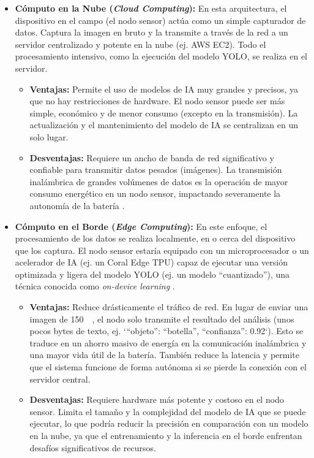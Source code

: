 \begin{itemize}
    \item \textbf{Cómputo en la Nube (\textit{Cloud Computing}):} En esta arquitectura, el dispositivo en el campo (el nodo sensor) actúa como un simple capturador de datos. Captura la imagen en bruto y la transmite a través de la red a un servidor centralizado y potente en la nube (ej. AWS EC2). Todo el procesamiento intensivo, como la ejecución del modelo YOLO, se realiza en el servidor.
    \begin{itemize}
        \item \textbf{Ventajas:} Permite el uso de modelos de IA muy grandes y precisos, ya que no hay restricciones de hardware. El nodo sensor puede ser más simple, económico y de menor consumo (excepto en la transmisión). La actualización y el mantenimiento del modelo de IA se centralizan en un solo lugar.
        
        \item \textbf{Desventajas:} Requiere un ancho de banda de red significativo y confiable para transmitir datos pesados (imágenes). La transmisión inalámbrica de grandes volúmenes de datos es la operación de mayor consumo energético en un nodo sensor, impactando severamente la autonomía de la batería \cite{Saradha2025comprehensive}.
    \end{itemize}

    \item \textbf{Cómputo en el Borde (\textit{Edge Computing}):} En este enfoque, el procesamiento de los datos se realiza localmente, en o cerca del dispositivo que los captura. El nodo sensor estaría equipado con un microprocesador o un acelerador de IA (ej. un Coral Edge TPU) capaz de ejecutar una versión optimizada y ligera del modelo YOLO (ej. un modelo ``cuantizado''), una técnica conocida como \textit{on-device learning} \cite{khouas2024training}.
    \begin{itemize}
        \item \textbf{Ventajas:} Reduce drásticamente el tráfico de red. En lugar de enviar una imagen de \SI{150}{\kilo\byte}, el nodo solo transmite el resultado del análisis (unos pocos bytes de texto, ej. `{``objeto'': ``botella'', ``confianza'': 0.92}`). Esto se traduce en un ahorro masivo de energía en la comunicación inalámbrica y una mayor vida útil de la batería. También reduce la latencia y permite que el sistema funcione de forma autónoma si se pierde la conexión con el servidor central.
        \item \textbf{Desventajas:} Requiere hardware más potente y costoso en el nodo sensor. Limita el tamaño y la complejidad del modelo de IA que se puede ejecutar, lo que podría reducir la precisión en comparación con un modelo en la nube, ya que el entrenamiento y la inferencia en el borde enfrentan desafíos significativos de recursos.
    \end{itemize}
\end{itemize}

